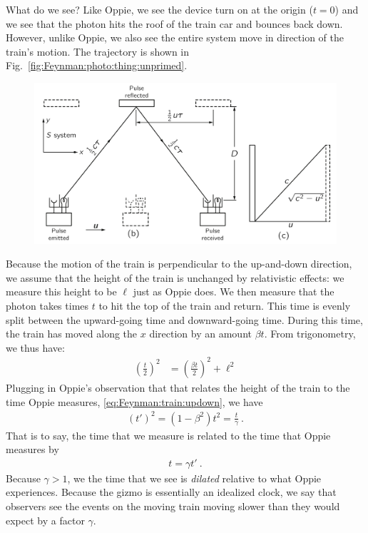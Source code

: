 \documentclass[12pt, oneside]{report}    %
\begin{document}
\begin{subappendices}
What do we see? Like Oppie, we see the device turn on at the origin ($t=0$) and we see that the photon hits the roof of the train car and bounces back down. However, unlike Oppie, we also see the entire system move in direction of the train's motion. The trajectory is shown in Fig.~\ref{fig:Feynman:photo:thing:unprimed}.
\begin{figure}[h]
\includegraphics[width=\textwidth]{FeynmanLec15_photodetside.png}
\end{figure}
Because the motion of the train is perpendicular to the up-and-down direction, we assume that the height of the train is unchanged by relativistic effects: we measure this height to be $\ell$ just as Oppie does. We then measure that the photon takes times $t$ to hit the top of the train and return. This time is evenly split between the upward-going time and downward-going time. During this time, the train has moved along the $x$ direction by an amount $\beta t$. From trigonometry, we thus have:
\begin{align}
    \left(\frac{t}{2}\right)^2
    &= 
    \left(\frac{\beta t}{2}\right)^2 + \ell^2
\end{align}
Plugging in Oppie's observation that that relates the height of the train to the time Oppie measures, \eqref{eq:Feynman:train:updown}, we have
\begin{align}
    (t')^2 = (1-\beta^2) t^2 =  \frac{t}{\gamma} \ .
\end{align}
That is to say, the time that we measure is related to the time that Oppie measures by
\begin{align}
    t = \gamma t' \ .
    \label{eq:time:dilation:derived}
\end{align}
Because $\gamma > 1$, we the time that we see is \emph{dilated} relative to what Oppie experiences. Because the gizmo is essentially an idealized clock, we say that observers see the events on the moving train moving  slower than they would expect by a factor $\gamma$. 





\end{subappendices}
\end{document}
